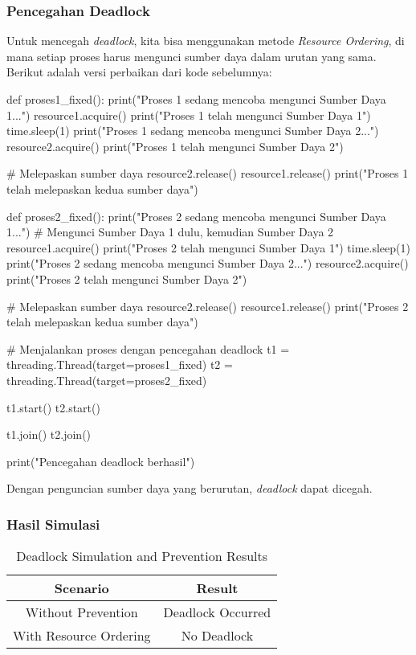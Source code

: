 \documentclass[12pt]{article}
\begin{document}
\subsubsection{Pencegahan Deadlock}
Untuk mencegah \textit{deadlock}, kita bisa menggunakan metode \textit{Resource Ordering}, di mana setiap proses harus mengunci sumber daya dalam urutan yang sama. Berikut adalah versi perbaikan dari kode sebelumnya:

\begin{python}
def proses1_fixed():
    print("Proses 1 sedang mencoba mengunci Sumber Daya 1...")
    resource1.acquire()
    print("Proses 1 telah mengunci Sumber Daya 1")
    time.sleep(1)
    print("Proses 1 sedang mencoba mengunci Sumber Daya 2...")
    resource2.acquire()
    print("Proses 1 telah mengunci Sumber Daya 2")
    
    # Melepaskan sumber daya
    resource2.release()
    resource1.release()
    print("Proses 1 telah melepaskan kedua sumber daya")

def proses2_fixed():
    print("Proses 2 sedang mencoba mengunci Sumber Daya 1...")  # Mengunci Sumber Daya 1 dulu, kemudian Sumber Daya 2
    resource1.acquire()
    print("Proses 2 telah mengunci Sumber Daya 1")
    time.sleep(1)
    print("Proses 2 sedang mencoba mengunci Sumber Daya 2...")
    resource2.acquire()
    print("Proses 2 telah mengunci Sumber Daya 2")
    
    # Melepaskan sumber daya
    resource2.release()
    resource1.release()
    print("Proses 2 telah melepaskan kedua sumber daya")

# Menjalankan proses dengan pencegahan deadlock
t1 = threading.Thread(target=proses1_fixed)
t2 = threading.Thread(target=proses2_fixed)

t1.start()
t2.start()

t1.join()
t2.join()

print("Pencegahan deadlock berhasil")
\end{python}

Dengan penguncian sumber daya yang berurutan, \textit{deadlock} dapat dicegah.

\subsubsection{Hasil Simulasi}

\begin{table}[htbp]
    \centering
    \begin{tabular}{|c|c|}
    \hline
    \textbf{Scenario} & \textbf{Result} \\
    \hline
    Without Prevention & Deadlock Occurred \\
    \hline
    With Resource Ordering & No Deadlock \\
    \hline
    \end{tabular}
    \caption{Deadlock Simulation and Prevention Results}
    \label{tab:deadlock}
\end{table}
\end{document}
